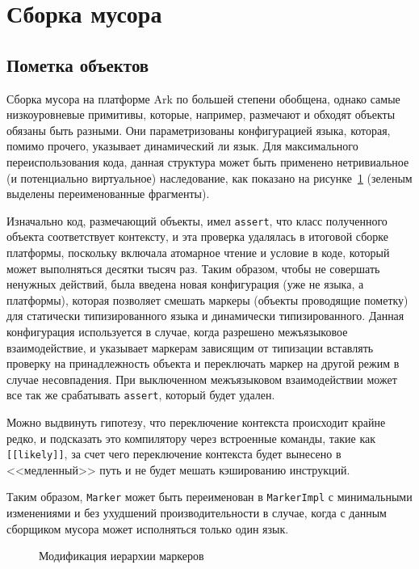 \documentclass[times
]{itmo-student-thesis}
\begin{document}
\section{Сборка мусора}
\subsection{Пометка объектов}
Сборка мусора на платформе Ark по большей степени обобщена, однако самые низкоуровневые примитивы, которые, например, размечают и обходят объекты обязаны быть разными. Они параметризованы конфигурацией языка, которая, помимо прочего, указывает динамический ли язык. Для максимального переиспользования кода, данная структура может быть применено нетривиальное (и потенциально виртуальное) наследование, как показано на рисунке~\ref{fig:gc-markers} (зеленым выделены переименованные фрагменты).

Изначально код, размечающий объекты, имел \texttt{assert}, что класс полученного объекта соответствует контексту, и эта проверка удалялась в итоговой сборке платформы, поскольку включала атомарное чтение и условие в коде, который может выполняться десятки тысяч раз. Таким образом, чтобы не совершать ненужных действий, была введена новая конфигурация (уже не языка, а платформы), которая позволяет смешать маркеры (объекты проводящие пометку) для статически типизированного языка и динамически типизированного. Данная конфигурация используется в случае, когда разрешено межъязыковое взаимодействие, и указывает маркерам зависящим от типизации вставлять проверку на принадлежность объекта и переключать маркер на другой режим в случае несовпадения. При выключенном межъязыковом взаимодействии может все так же срабатывать \texttt{assert}, который будет удален.

Можно выдвинуть гипотезу, что переключение контекста происходит крайне редко, и подсказать это компилятору через встроенные команды, такие как \texttt{[[likely]]}, за счет чего переключение контекста будет вынесено в <<медленный>> путь и не будет мешать кэшированию инструкций.

Таким образом, \texttt{Marker} может быть переименован в \texttt{MarkerImpl} с минимальными изменениями и без ухудшений производительности в случае, когда с данным сборщиком мусора может исполняться только один язык.
\begin{figure}[!h]
\caption{Модификация иерархии маркеров}\label{fig:gc-markers}
\centering
\end{figure}
\end{document}
